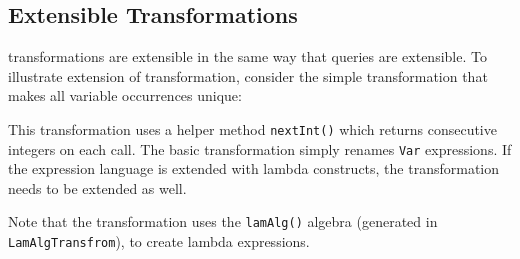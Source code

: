 
\subsection{Extensible Transformations}

\name transformations are extensible in the same way that \name queries are extensible.
To illustrate extension of transformation, consider the simple transformation that makes all variable occurrences unique:


This transformation uses a helper method \lstinline{nextInt()} which returns consecutive integers on each call.
The basic transformation simply renames \lstinline{Var} expressions.
If the expression language is extended with lambda constructs, the transformation needs to be extended as well.


Note that the transformation uses the \lstinline{lamAlg()} algebra (generated in \lstinline{LamAlgTransfrom}),
to create lambda expressions.



  
